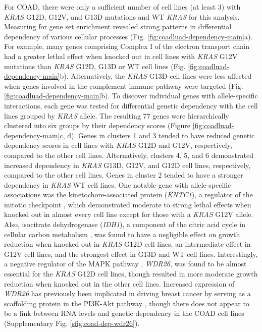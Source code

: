 \documentclass[english, 10pt, letterpaper]{article}
\newcommand{\KRAS}{\emph{KRAS}}
\begin{document}
For COAD, there were only a sufficient number of cell lines (at least 3) with \KRAS{} G12D, G12V, and G13D mutations and WT \KRAS{} for this analysis.
Measuring for gene set enrichment revealed strong patterns in differential dependency of various cellular processes (Fig. \ref{fig:coadluad-dependency-main}a).
For example, many genes comprising Complex I of the electron transport chain had a greater lethal effect when knocked out in cell lines with \KRAS{} G12V mutations than \KRAS{} G12D, G13D or WT cell lines (Fig. \ref{fig:coadluad-dependency-main}b).
Alternatively, the \KRAS{} G13D cell lines were less affected when genes involved in the complement immune pathway were targeted (Fig. \ref{fig:coadluad-dependency-main}b).
To discover individual genes with allele-specific interactions, each gene was tested for differential genetic dependency with the cell lines grouped by \KRAS{} allele.
The resulting 77 genes were hierarchically clustered into six groups by their dependency scores (Figure \ref{fig:coadluad-dependency-main}c, d).
Genes in clusters 1 and 3 tended to have reduced genetic dependency scores in cell lines with \KRAS{} G12D and G12V, respectively, compared to the other cell lines.
Alternatively, clusters 4, 5, and 6 demonstrated increased dependency in \KRAS{} G13D, G12V, and G12D cell lines, respectively, compared to the other cell lines.
Genes in cluster 2 tended to have a stronger dependency in \KRAS{} WT cell lines.
One notable gene with allele-specific associations was the kinetochore-associated protein (\emph{KNTC1}), a regulator of the mitotic checkpoint \cite{Chan2000HumanKinetochores., Scaerou2001TheKinetochore., Kops2005ZW10Kinetochore.}, which demonstrated moderate to strong lethal effects when knocked out in almost every cell line except for those with a \KRAS{} G12V allele.
Also, isocitrate dehydrogenase (\emph{IDH1}), a component of the citric acid cycle in cellular carbon metabolism \cite{Geisbrecht1999TheDehydrogenase.}, was found to have a negligible effect on growth reduction when knocked-out in \KRAS{} G12D cell lines, an intermediate effect in G12V cell lines, and the strongest effect in G13D and WT cell lines.
Interestingly, a negative regulator of the MAPK pathway \cite{Goto2016WDR26Pathway.}, \emph{WDR26}, was found to be almost essential for the \KRAS{} G12D cell lines, though resulted in more moderate growth reduction when knocked out in the other cell lines.
Increased expression of \emph{WDR26} has previously been implicated in driving breast cancer by serving as a scaffolding protein in the PI3K-Akt pathway \cite{Ye2016UpregulatedInvasion.}, though there does not appear to be a link between RNA levels and genetic dependency in the COAD cell lines (Supplementary Fig. \ref{sfig:coad-dep-wdr26}).
\end{document}

